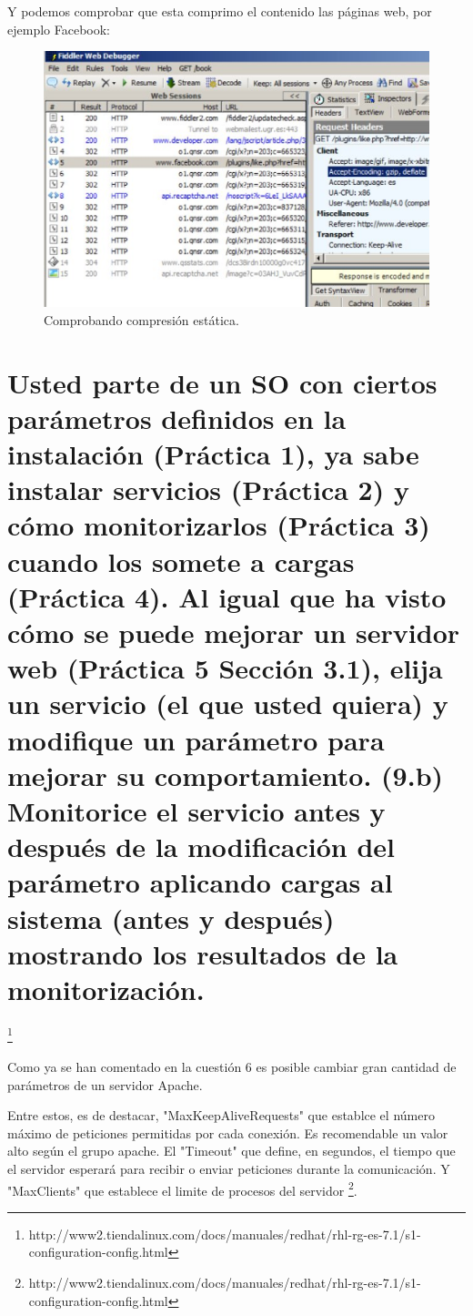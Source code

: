 Y podemos comprobar que esta comprimo el contenido las páginas web, por ejemplo Facebook:
\begin{figure}[H]
\begin{center}
\includegraphics[scale=0.5]{imagenes/cuestion7-3.eps}
\caption{Comprobando compresión estática.}
\end{center}
\end{figure} 

\section{ Usted parte de un SO con ciertos parámetros definidos en la instalación (Práctica 1), ya sabe instalar servicios (Práctica 2) y cómo monitorizarlos (Práctica 3) cuando los somete a cargas (Práctica 4). Al igual que ha visto cómo se puede mejorar un servidor web (Práctica 5 Sección 3.1), elija un servicio (el que usted quiera) y modifique un parámetro para mejorar su comportamiento. (9.b) Monitorice el servicio antes y después de la modificación del parámetro aplicando cargas al sistema (antes y después) mostrando los resultados de la monitorización.}
\footnote{http://www2.tiendalinux.com/docs/manuales/redhat/rhl-rg-es-7.1/s1-configuration-config.html}

Como ya se han comentado en la cuestión 6 es posible cambiar gran cantidad de parámetros de un servidor Apache.

Entre estos, es de destacar, "MaxKeepAliveRequests" que establce el número máximo de peticiones permitidas por cada conexión. Es recomendable un valor alto según el grupo apache. El "Timeout" que define, en segundos, el tiempo que el servidor esperará  para recibir o enviar peticiones durante la comunicación. Y "MaxClients" que establece el limite de procesos del servidor \footnote{http://www2.tiendalinux.com/docs/manuales/redhat/rhl-rg-es-7.1/s1-configuration-config.html}.

